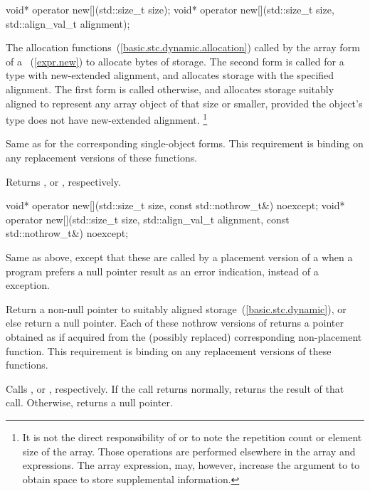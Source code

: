 %
\begin{itemdecl}
void* operator new[](std::size_t size);
void* operator new[](std::size_t size, std::align_val_t alignment);
\end{itemdecl}

\begin{itemdescr}
\pnum
\effects
The
allocation functions~(\ref{basic.stc.dynamic.allocation})
called by the array form of a
~(\ref{expr.new})
to allocate
 bytes of storage.
The second form is called for a type with new-extended alignment,
and allocates storage
with the specified alignment.
The first form is called otherwise,
and allocates storage
suitably aligned to represent any array object of that size or smaller,
provided the object's type does not have new-extended alignment.%
\footnote{It is not the direct responsibility of
or
to note the repetition count or element size of the array.
Those operations are performed elsewhere in the array
and
expressions.
The array
expression, may, however, increase the  argument to
to obtain space to store supplemental information.}

\pnum
\replaceable
{}

\pnum
\required
Same as for
the corresponding single-object forms.
This requirement is binding on any replacement versions of these functions.

\pnum
{}
Returns
,
or
,
respectively.
\end{itemdescr}

%
\begin{itemdecl}
void* operator new[](std::size_t size, const std::nothrow_t&) noexcept;
void* operator new[](std::size_t size, std::align_val_t alignment, const std::nothrow_t&) noexcept;
\end{itemdecl}

\begin{itemdescr}
\pnum
\effects
Same as above, except that these are called by a placement version of a
when a \Cpp program prefers a null pointer result as an error indication,
instead of a
exception.

\pnum
\replaceable
{}

\pnum
\required
Return a non-null pointer to suitably aligned storage~(\ref{basic.stc.dynamic}),
or else return a null pointer.
Each of these nothrow versions of
returns a pointer obtained as if
acquired from the (possibly replaced)
corresponding non-placement function.
This requirement is binding on any replacement versions of these functions.

\pnum
{}
Calls ,
or ,
respectively.
If the call returns normally,
returns the result of that call.
Otherwise, returns a null pointer.
\end{itemdescr}

